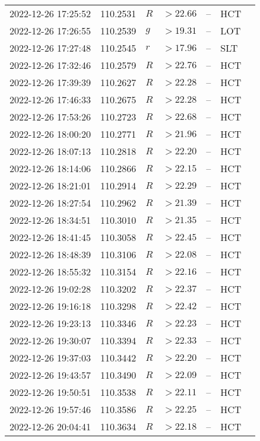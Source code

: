 \documentclass{nature_plusfigure}
\begin{document}
\begin{supplement}
\begin{center}
\begin{longtable}{lllllll}
2022-12-26 17:25:52 & 110.2531 & $R$ & $>22.66$ & -- & HCT &  \\ 
2022-12-26 17:26:55 & 110.2539 & $g$ & $>19.31$ & -- & LOT &  \\ 
2022-12-26 17:27:48 & 110.2545 & $r$ & $>17.96$ & -- & SLT &  \\ 
2022-12-26 17:32:46 & 110.2579 & $R$ & $>22.76$ & -- & HCT &  \\ 
2022-12-26 17:39:39 & 110.2627 & $R$ & $>22.28$ & -- & HCT &  \\ 
2022-12-26 17:46:33 & 110.2675 & $R$ & $>22.28$ & -- & HCT &  \\ 
2022-12-26 17:53:26 & 110.2723 & $R$ & $>22.68$ & -- & HCT &  \\ 
2022-12-26 18:00:20 & 110.2771 & $R$ & $>21.96$ & -- & HCT &  \\ 
2022-12-26 18:07:13 & 110.2818 & $R$ & $>22.20$ & -- & HCT &  \\ 
2022-12-26 18:14:06 & 110.2866 & $R$ & $>22.15$ & -- & HCT &  \\ 
2022-12-26 18:21:01 & 110.2914 & $R$ & $>22.29$ & -- & HCT &  \\ 
2022-12-26 18:27:54 & 110.2962 & $R$ & $>21.39$ & -- & HCT &  \\ 
2022-12-26 18:34:51 & 110.3010 & $R$ & $>21.35$ & -- & HCT &  \\ 
2022-12-26 18:41:45 & 110.3058 & $R$ & $>22.45$ & -- & HCT &  \\ 
2022-12-26 18:48:39 & 110.3106 & $R$ & $>22.08$ & -- & HCT &  \\ 
2022-12-26 18:55:32 & 110.3154 & $R$ & $>22.16$ & -- & HCT &  \\ 
2022-12-26 19:02:28 & 110.3202 & $R$ & $>22.37$ & -- & HCT &  \\ 
2022-12-26 19:16:18 & 110.3298 & $R$ & $>22.42$ & -- & HCT &  \\ 
2022-12-26 19:23:13 & 110.3346 & $R$ & $>22.23$ & -- & HCT &  \\ 
2022-12-26 19:30:07 & 110.3394 & $R$ & $>22.33$ & -- & HCT &  \\ 
2022-12-26 19:37:03 & 110.3442 & $R$ & $>22.20$ & -- & HCT &  \\ 
2022-12-26 19:43:57 & 110.3490 & $R$ & $>22.09$ & -- & HCT &  \\ 
2022-12-26 19:50:51 & 110.3538 & $R$ & $>22.11$ & -- & HCT &  \\ 
2022-12-26 19:57:46 & 110.3586 & $R$ & $>22.25$ & -- & HCT &  \\ 
2022-12-26 20:04:41 & 110.3634 & $R$ & $>22.18$ & -- & HCT &  \\ 

\end{longtable}
\end{center}
\end{supplement}
\end{document}
